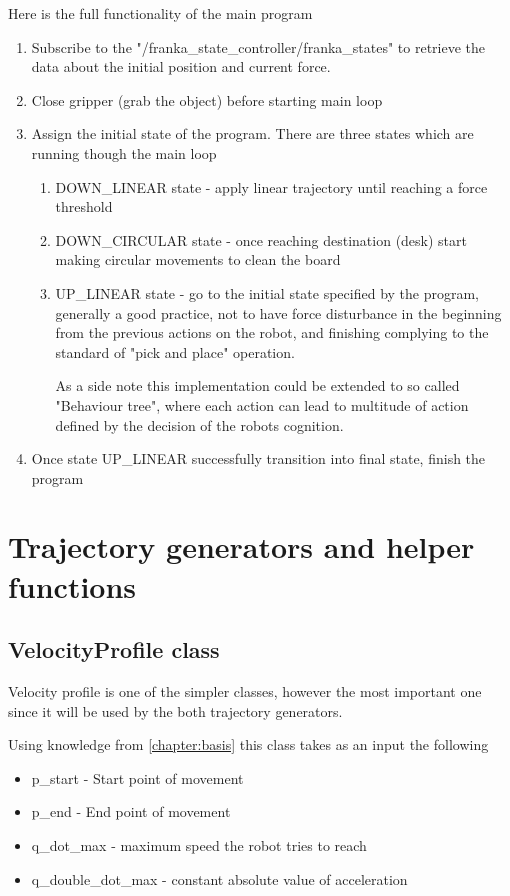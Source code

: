 Here is the full functionality of the main program 
\begin{enumerate}
    \item Subscribe to the "/franka\_state\_controller/franka\_states" to retrieve the data about the initial position and current force.
    \item Close gripper (grab the object) before starting main loop
    \item Assign the initial state of the program. There are three states which are running though the main loop
    \begin{enumerate}
        \item DOWN\_LINEAR state - apply linear trajectory until reaching a force threshold
        \item DOWN\_CIRCULAR state - once reaching destination (desk) start making circular movements to clean the board
        \item UP\_LINEAR state - go to the initial state specified by the program, generally a good practice, not to have force disturbance in the beginning from the previous actions on the robot, and finishing complying to the standard of "pick and place" operation.

    As a side note this implementation could be extended to so called "Behaviour tree", where each action can lead to multitude of action defined by the decision of the robots cognition.
    \end{enumerate}
    \item Once state UP\_LINEAR successfully transition into final state, finish the program
\end{enumerate}

\section{Trajectory generators and helper functions}

\subsection{VelocityProfile class}
Velocity profile is one of the simpler classes, however the most important one since it will be used by the both trajectory generators. 

Using knowledge from \ref{chapter:basis} this class takes as an input the following 
\begin{itemize}
    \item p\_start - Start point of movement
    \item p\_end - End point of movement
    \item q\_dot\_max - maximum speed the robot tries to reach 
    \item q\_double\_dot\_max - constant absolute value of acceleration 
\end{itemize}


